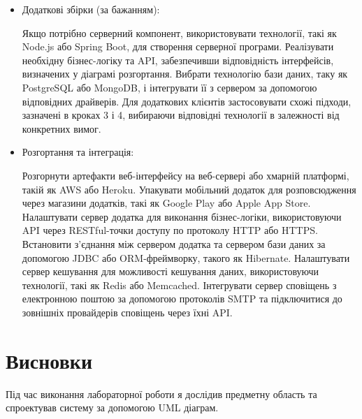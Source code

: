\documentclass[oneside,14pt]{extarticle}
\begin{document}
\begin{normalsize}
\begin{itemize}
	\item Додаткові збірки (за бажанням):
	
    Якщо потрібно серверний компонент, використовувати технології, такі як Node.js або Spring Boot, для створення серверної програми.
Реалізувати необхідну бізнес-логіку та API, забезпечивши відповідність інтерфейсів, визначених у діаграмі розгортання.
Вибрати технологію бази даних, таку як PostgreSQL або MongoDB, і інтегрувати її з сервером за допомогою відповідних драйверів.
Для додаткових клієнтів застосовувати схожі підходи, зазначені в кроках 3 і 4, вибираючи відповідні технології в залежності від конкретних вимог.
	
	\item 	Розгортання та інтеграція:
	
    Розгорнути артефакти веб-інтерфейсу на веб-сервері або хмарній платформі, такій як AWS або Heroku.
Упакувати мобільний додаток для розповсюдження через магазини додатків, такі як Google Play або Apple App Store.
Налаштувати сервер додатка для виконання бізнес-логіки, використовуючи API через RESTful-точки доступу по протоколу HTTP або HTTPS.
Встановити з'єднання між сервером додатка та сервером бази даних за допомогою JDBC або ORM-фреймворку, такого як Hibernate.
Налаштувати сервер кешування для можливості кешування даних, використовуючи технології, такі як Redis або Memcached.
Інтегрувати сервер сповіщень з електронною поштою за допомогою протоколів SMTP та підключитися до зовнішніх провайдерів сповіщень через їхні API.
	
	\end{itemize}
	

	\section*{Висновки}
	   Під час виконання лабораторної роботи я дослідив предметну область та
	   спроектував систему за допомогою UML діаграм.
\end{normalsize}
\end{document}
